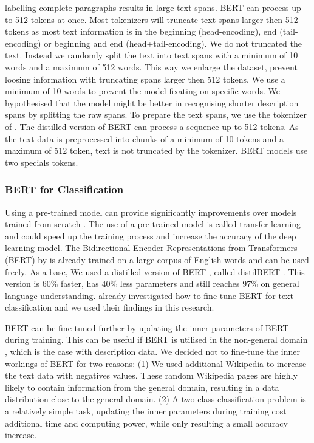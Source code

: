 \documentclass[a4paper, 12pt, oneside]{book} %
\begin{document}
labelling complete paragraphs results in large text spans. 
BERT can process up to 512 tokens at once.
Most tokenizers will truncate text spans larger then 512 tokens as most text information is in the beginning (head-encoding), end (tail-encoding) or beginning and end (head+tail-encoding).
We do not truncated the text.
Instead we randomly split the text into text spans with a minimum of 10 words and a maximum of 512 words.
This way we enlarge the dataset, prevent loosing information with truncating spans larger then 512 tokens. 
We use a minimum of 10 words to prevent the model fixating on specific words.
We hypothesised that the model might be better in recognising shorter description spans by splitting the raw spans.  
To prepare the text spans, we use the tokenizer of \textcite{wolf_huggingfaces_2020}.
The distilled version of BERT can process a sequence up to 512 tokens.
As the text data is preprocessed into chunks of a minimum of 10 tokens and a maximum of 512 token, text is not truncated by the tokenizer. 
BERT models use two specials tokens.

\subsubsection{BERT for Classification}
Using a pre-trained model can provide significantly improvements over models trained from scratch \autocite{mikolov_distributed_2013}.
The use of a pre-trained model is called transfer learning and could speed up the training process and increase the accuracy of the deep learning model.
The Bidirectional Encoder Representations from Transformers (BERT) by \textcite{devlin_bert_2019} is already trained on a large corpus of English words and can be used freely.
As a base, We used a distilled version of BERT \autocite{devlin_bert_2019}, called distilBERT \autocite{sanh_distilbert_2020}. 
This version is 60\% faster, has 40\% less parameters and still reaches 97\% on general language understanding.
\textcite{sun_how_2020} already investigated how to fine-tune BERT for text classification and we used their findings in this research.

BERT can be fine-tuned further by updating the inner parameters of BERT during training. 
This can be useful if BERT is utilised in the non-general domain \autocite{devlin_bert_2019, sun_how_2020, sanh_distilbert_2020}, which is the case with description data.
We decided not to fine-tune the inner workings of BERT for two reasons: 
(1) We used additional Wikipedia to increase the text data with negatives values.
These random Wikipedia pages are highly likely to contain information from the general
domain, resulting in a  data distribution close to the general domain.
(2) A two class-classification problem is a relatively simple task, updating the inner parameters during training cost additional time and computing power, while only resulting a small accuracy increase.
\end{document}
